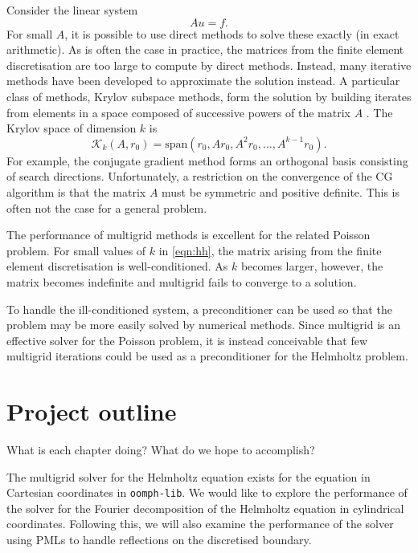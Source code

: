 Consider the linear system
\[
	A u = f.
\]
For small $A$, it is possible to use direct methods to solve these exactly (in exact arithmetic).
As is often the case in practice, the matrices from the finite element discretisation are too large to compute by direct methods.
Instead, many iterative methods have been developed to approximate the solution instead.
A particular class of methods, Krylov subspace methods, form the solution by building iterates from elements in a space composed of successive powers of the matrix $A$ \cite{leveque}.
The Krylov space of dimension $k$ is 
\[
	\mathcal{K}_k(A, r_0) = \mathrm{span}(r_0, Ar_0, A^2 r_0, \ldots, A^{k-1} r_0).
\]
For example, the conjugate gradient method forms an orthogonal basis consisting of search directions.
Unfortunately, a restriction on the convergence of the CG algorithm is that the matrix $A$ must be symmetric and positive definite.
This is often not the case for a general problem.

The performance of multigrid methods is excellent for the related Poisson problem.
For small values of $k$ in \eqref{eqn:hh}, the matrix arising from the finite element discretisation is well-conditioned.
As $k$ becomes larger, however, the matrix becomes indefinite and multigrid fails to converge to a solution.

To handle the ill-conditioned system, a preconditioner can be used so that the problem may be more easily solved by numerical methods.
Since multigrid is an effective solver for the Poisson problem, it is instead conceivable that few multigrid iterations could be used as a preconditioner for the Helmholtz problem.







\section{Project outline}

What is each chapter doing? What do we hope to accomplish? 

The multigrid solver for the Helmholtz equation exists for the equation in Cartesian coordinates in \texttt{oomph-lib}.
We would like to explore the performance of the solver for the Fourier decomposition of the Helmholtz equation in cylindrical coordinates.
Following this, we will also examine the performance of the solver using PMLs to handle reflections on the discretised boundary.

